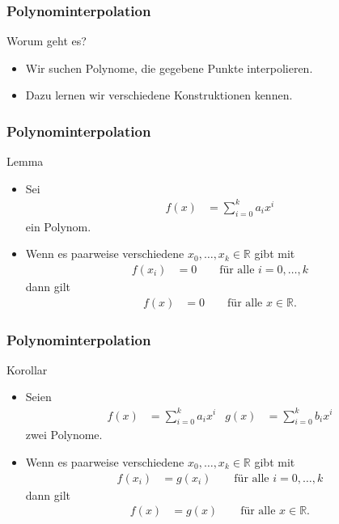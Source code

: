 \documentclass{beamer}
\title[Annuma]{\mytitle}
\author[Amin Coja-Oghlan]{Amin Coja-Oghlan}
\institute[Frankfurt]{JWGUFFM}
\date{}
\newcommand\RR{\mathbb R}
\newcommand{\ue}{\"u}
\newcommand{\mytitle}{Polynominterpolation}
\begin{document}
\frame[plain]{\titlepage}

\begin{frame}\frametitle{\mytitle}
	\begin{block}{Worum geht es?}
		\begin{itemize}
			\item Wir suchen Polynome, die gegebene Punkte interpolieren.
			\item Dazu lernen wir verschiedene Konstruktionen kennen.
		\end{itemize}
	\end{block}
\end{frame}

\begin{frame}\frametitle{\mytitle}
	\begin{block}{Lemma}
		\begin{itemize}
			\item Sei
				\begin{align*}
					f(x)&=\sum_{i=0}^ka_ix^i
				\end{align*}
				ein Polynom.
			\item Wenn es paarweise verschiedene $x_0,\ldots,x_k\in\RR$ gibt mit
				\begin{align*}
					f(x_i)&=0\qquad\mbox{f\ue r alle }i=0,\ldots,k
				\end{align*}
				dann gilt
				\begin{align*}
					f(x)&=0\qquad\mbox{f\ue r alle }x\in\RR.
				\end{align*}
		\end{itemize}
	\end{block}
\end{frame}

\begin{frame}\frametitle{\mytitle}
	\begin{block}{Korollar}
		\begin{itemize}
			\item Seien
				\begin{align*}
					f(x)&=\sum_{i=0}^ka_ix^i&g(x)&=\sum_{i=0}^kb_ix^i
				\end{align*}
				zwei Polynome.
			\item Wenn es paarweise verschiedene $x_0,\ldots,x_k\in\RR$ gibt mit
				\begin{align*}
					f(x_i)&=g(x_i)\qquad\mbox{f\ue r alle }i=0,\ldots,k
				\end{align*}
				dann gilt
				\begin{align*}
					f(x)&=g(x)\qquad\mbox{f\ue r alle }x\in\RR.
				\end{align*}
		\end{itemize}
	\end{block}
\end{frame}
\end{document}
